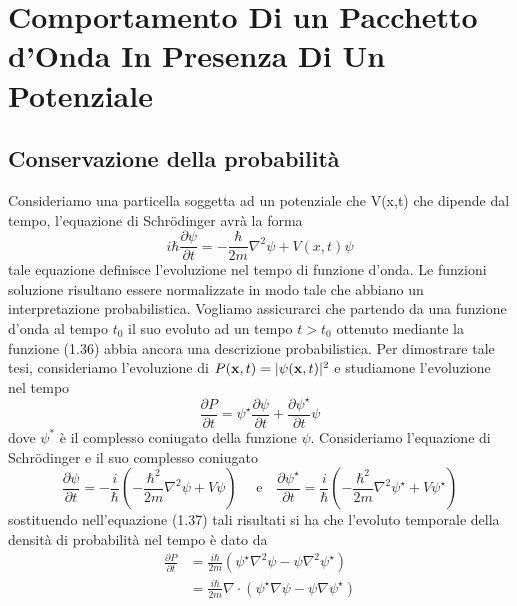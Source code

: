  \section{Comportamento Di un Pacchetto d'Onda In Presenza Di Un Potenziale }
 
 \subsection{Conservazione della probabilit\`a}
 
 Consideriamo una particella soggetta ad un potenziale che V(x,t) che dipende dal tempo, l'equazione di Schr\"odinger avr\`a la forma 
 \begin{equation}
 	i \hbar \frac{\partial \psi}{\partial t} = - \frac{\hbar}{2m} \nabla^2\psi +V(x,t)\psi 
 \end{equation}
tale equazione definisce l'evoluzione nel tempo di funzione d'onda. Le funzioni soluzione risultano essere normalizzate in modo tale che abbiano un interpretazione probabilistica. Vogliamo assicurarci che partendo da una funzione d'onda al tempo $t_0$ il suo evoluto ad un tempo $t > t_0$ ottenuto mediante la funzione (1.36) abbia ancora una descrizione probabilistica. Per dimostrare tale tesi, consideriamo l'evoluzione di $P(\bold{x},t) = |\psi(\bold{x},t)|^2  $ e studiamone l'evoluzione nel tempo
\begin{equation}
	\frac{\partial P}{\partial t}=\psi^{\star} \frac{\partial \psi}{\partial t}+\frac{\partial \psi^{\star}}{\partial t} \psi
\end{equation}
dove $\psi^*$ \`e il complesso coniugato della funzione $\psi$. Consideriamo l'equazione di Schr\"odinger e il suo complesso coniugato
\begin{equation*}
	\frac{\partial \psi}{\partial t}=-\frac{i}{\hbar}\left(-\frac{\hbar^2}{2 m} \nabla^2 \psi+V \psi\right) \quad \text { e} \quad \frac{\partial \psi^{\star}}{\partial t}=\frac{i}{\hbar}\left(-\frac{\hbar^2}{2 m} \nabla^2 \psi^{\star}+V \psi^{\star}\right)
\end{equation*}
 sostituendo nell'equazione (1.37)
 tali risultati si ha che l'evoluto temporale della densit\`a di probabilit\`a nel tempo \`e dato da 
 \begin{equation*}
 	\begin{aligned}
\frac{\partial P}{\partial t} & =\frac{i \hbar}{2 m}\left(\psi^{\star} \nabla^2 \psi-\psi \nabla^2 \psi^{\star}\right) \\[0.4cm]
& =\frac{i \hbar}{2 m} \nabla \cdot\left(\psi^{\star} \nabla \psi-\psi \nabla \psi^{\star}\right)
\end{aligned}
 \end{equation*}
